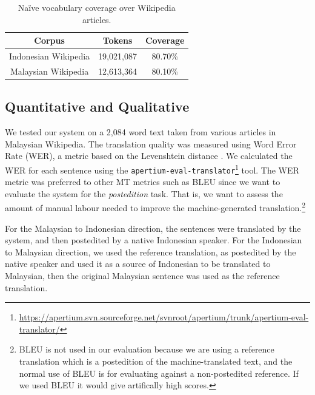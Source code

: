 \documentclass[10pt,a5paper,twoside]{article}
\begin{document}
\begin{table}[htbp]
  \begin{center}
  \begin{tabular}{ccc}
  \toprule
  \bf{Corpus} & \bf{Tokens} & \bf{Coverage}\\
  \midrule
  Indonesian Wikipedia & 19,021,087 & 80.70\% \\
  \midrule
  Malaysian Wikipedia & 12,613,364 & 80.10\% \\
  \bottomrule
  \end{tabular}
  \caption{Na\"ive vocabulary coverage over Wikipedia articles.}
  \label{table:coverage}
  \end{center}
\end{table}

\subsection{Quantitative and Qualitative}
We tested our system on a 2,084 word text taken from various articles in Malaysian Wikipedia. The translation quality was measured using Word Error Rate (WER), a metric based on the Levenshtein distance \citep{levenshtein/1966}. We calculated the WER for each sentence using the \texttt{\small{apertium-eval-translator}}\footnote{\url{https://apertium.svn.sourceforge.net/svnroot/apertium/trunk/apertium-eval-translator/}} tool. The WER metric was preferred to other MT metrics such as BLEU \citep{Papineni2002bleu} since we want to evaluate the system for the \emph{postedition} task. That is, we want to assess the amount of manual labour needed to improve the machine-generated translation.\footnote{BLEU is not used in our evaluation because we are using a reference translation which is a postedition of the machine-translated text, and the normal use of BLEU is for evaluating against a non-postedited reference. If we used BLEU it would give artifically high scores.}

For the Malaysian to Indonesian direction, the sentences were translated by the system, and then postedited by a native Indonesian speaker. For the Indonesian to Malaysian direction, we used the reference translation, as postedited by the native speaker and used it as a source of Indonesian to be translated to Malaysian, then the original Malaysian sentence was used as the reference translation.
\end{document}

